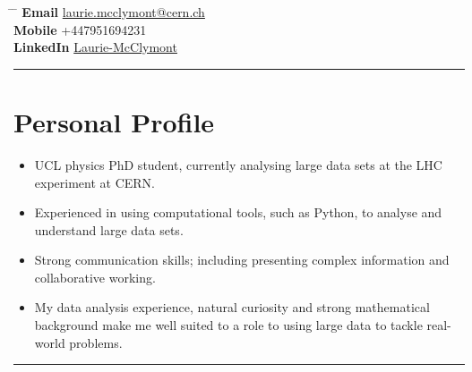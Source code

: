 \documentclass[10pt]{article} %
\begin{document}


\parbox{0.5\textwidth}{ %
\title{} %
}
\hspace{2cm} %
\parbox{0.5\textwidth}{ %
  \begin{tabbing} %
    \hspace{2cm} \= \hspace{3cm} \= \kill %
           {\bf Email} \> \href{mailto:laurie.mcclymont@cern.ch}{laurie.mcclymont@cern.ch} \\ %
           {\bf Mobile} \> +447951694231  \\ %
           {\bf LinkedIn} \> \href{https://www.linkedin.com/in/laurie-mcclymont-695520118/}{Laurie-McClymont} %
  \end{tabbing}
}

\rule{\textwidth}{0.5mm}


\vspace{-2mm}
\section{Personal Profile}
\begin{itemize}
\item{UCL physics PhD student, currently analysing large data sets at the LHC experiment at CERN.}
\item{Experienced in using computational tools, such as Python, to analyse and understand large data sets.}
\item{Strong communication skills; including presenting complex information and collaborative working.}
\item{My data analysis experience, natural curiosity and strong mathematical background make me well suited to a role to using large data to tackle real-world problems.}
\end{itemize}


\vspace{0.2mm}
\rule{\textwidth}{0.5mm}
\end{document}
